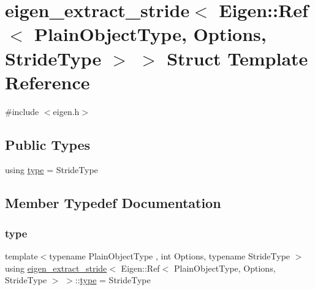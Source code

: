 \hypertarget{structeigen__extract__stride_3_01_eigen_1_1_ref_3_01_plain_object_type_00_01_options_00_01_stride_type_01_4_01_4}{}\section{eigen\+\_\+extract\+\_\+stride$<$ Eigen\+::Ref$<$ Plain\+Object\+Type, Options, Stride\+Type $>$ $>$ Struct Template Reference}
\label{structeigen__extract__stride_3_01_eigen_1_1_ref_3_01_plain_object_type_00_01_options_00_01_stride_type_01_4_01_4}


{\ttfamily \#include $<$eigen.\+h$>$}

\subsection*{Public Types}
\begin{DoxyCompactItemize}
\item 
using \mbox{\hyperlink{structeigen__extract__stride_3_01_eigen_1_1_ref_3_01_plain_object_type_00_01_options_00_01_stride_type_01_4_01_4_a057cc3e02bf77ac7ff9afebaa760cdeb}{type}} = Stride\+Type
\end{DoxyCompactItemize}


\subsection{Member Typedef Documentation}
\mbox{\label{structeigen__extract__stride_3_01_eigen_1_1_ref_3_01_plain_object_type_00_01_options_00_01_stride_type_01_4_01_4_a057cc3e02bf77ac7ff9afebaa760cdeb}} 
\subsubsection{\texorpdfstring{type}{type}}
{\footnotesize\ttfamily template$<$typename Plain\+Object\+Type , int Options, typename Stride\+Type $>$ \\
using \mbox{\hyperlink{structeigen__extract__stride}{eigen\+\_\+extract\+\_\+stride}}$<$ Eigen\+::\+Ref$<$ Plain\+Object\+Type, Options, Stride\+Type $>$ $>$\+::\mbox{\hyperlink{structeigen__extract__stride_3_01_eigen_1_1_ref_3_01_plain_object_type_00_01_options_00_01_stride_type_01_4_01_4_a057cc3e02bf77ac7ff9afebaa760cdeb}{type}} =  Stride\+Type}



